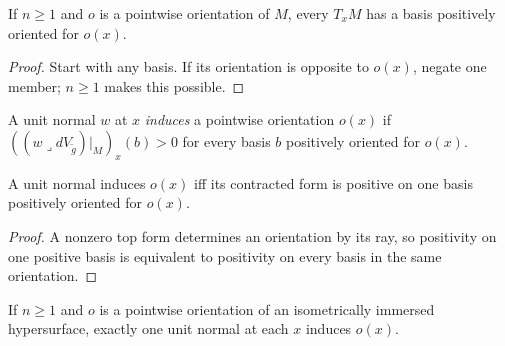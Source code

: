 \begin{lemma}
\label{lem:basis-realizing-orientation}





If $n\ge1$ and $o$ is a pointwise orientation of $M$, every $T_xM$ has a basis positively oriented for $o(x)$.
\end{lemma}

\begin{proof}

\sketch Start with any basis. If its orientation is opposite to $o(x)$, negate one member; $n\ge1$ makes this possible.
\end{proof}

\begin{definition}
\label{def:oriented-unit-normal}





A unit normal $w$ at $x$ \emph{induces} a pointwise orientation $o(x)$ if $((w\lrcorner dV_{\widetilde g})|_M)_x(b)>0$ for every basis $b$ positively oriented for $o(x)$.
\end{definition}

\begin{lemma}
\label{lem:oriented-unit-normal-iff-pos}





A unit normal induces $o(x)$ iff its contracted form is positive on one basis positively oriented for $o(x)$.
\end{lemma}

\begin{proof}

\sketch A nonzero top form determines an orientation by its ray, so positivity on one positive basis is equivalent to positivity on every basis in the same orientation.
\end{proof}

\begin{proposition}
\label{prop:existsunique-oriented-unit-normal}





If $n\ge1$ and $o$ is a pointwise orientation of an isometrically immersed hypersurface, exactly one unit normal at each $x$ induces $o(x)$.
\end{proposition}


